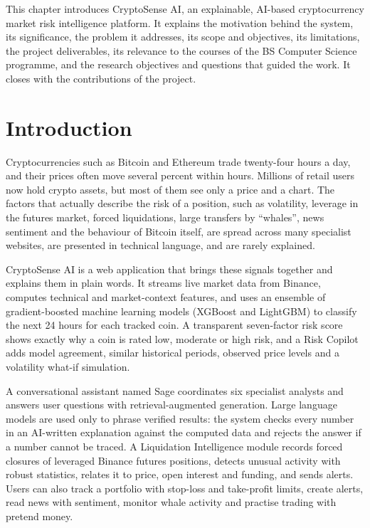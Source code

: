 
\chapteroverview
This chapter introduces CryptoSense AI, an explainable, AI-based cryptocurrency market risk intelligence platform. It explains the motivation behind the system, its significance, the problem it addresses, its scope and objectives, its limitations, the project deliverables, its relevance to the courses of the BS Computer Science programme, and the research objectives and questions that guided the work. It closes with the contributions of the project.

\section{Introduction}
Cryptocurrencies such as Bitcoin and Ethereum trade twenty-four hours a day, and their prices often move several percent within hours. Millions of retail users now hold crypto assets, but most of them see only a price and a chart. The factors that actually describe the risk of a position, such as volatility, leverage in the futures market, forced liquidations, large transfers by ``whales'', news sentiment and the behaviour of Bitcoin itself, are spread across many specialist websites, are presented in technical language, and are rarely explained.

CryptoSense AI is a web application that brings these signals together and explains them in plain words. It streams live market data from Binance, computes technical and market-context features, and uses an ensemble of gradient-boosted machine learning models (XGBoost and LightGBM) to classify the next 24 hours for each tracked coin. A transparent seven-factor risk score shows exactly why a coin is rated low, moderate or high risk, and a Risk Copilot adds model agreement, similar historical periods, observed price levels and a volatility what-if simulation.

A conversational assistant named Sage coordinates six specialist analysts and answers user questions with retrieval-augmented generation. Large language models are used only to phrase verified results: the system checks every number in an AI-written explanation against the computed data and rejects the answer if a number cannot be traced. A Liquidation Intelligence module records forced closures of leveraged Binance futures positions, detects unusual activity with robust statistics, relates it to price, open interest and funding, and sends alerts. Users can also track a portfolio with stop-loss and take-profit limits, create alerts, read news with sentiment, monitor whale activity and practise trading with pretend money.

